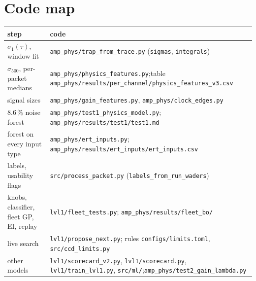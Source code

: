 \documentclass[10pt,a4paper]{article}
\newcommand{\code}[1]{\texttt{\small #1}}
\begin{document}
\section{Code map}
\begin{center}\small
\begin{tabularx}{\linewidth}{@{}lX@{}}\toprule
step & code\\\midrule
$\sigma_1(\tau)$, window fit & \code{amp\_phys/trap\_from\_trace.py} (\code{sigmas}, \code{integrals})\\
$\sigma_{500}$, per-packet medians & \code{amp\_phys/physics\_features.py};\newline table \code{amp\_phys/results/per\_channel/physics\_features\_v3.csv}\\
signal sizes & \code{amp\_phys/gain\_features.py}, \code{amp\_phys/clock\_edges.py}\\
8.6\,\% noise forest & \code{amp\_phys/test1\_physics\_model.py}; \code{amp\_phys/results/test1/test1.md}\\
forest on every input type & \code{amp\_phys/ert\_inputs.py}; \code{amp\_phys/results/ert\_inputs/ert\_inputs.csv}\\
labels, usability flags & \code{src/process\_packet.py} (\code{labels\_from\_run\_waders})\\
knobs, classifier, fleet GP, EI, replay & \code{lvl1/fleet\_tests.py}; \code{amp\_phys/results/fleet\_bo/}\\
live search & \code{lvl1/propose\_next.py}; rules \code{configs/limits.toml}, \code{src/ccd\_limits.py}\\
other models & \code{lvl1/scorecard\_v2.py}, \code{lvl1/scorecard.py}, \code{lvl1/train\_lvl1.py}, \code{src/ml/};\newline \code{amp\_phys/test2\_gain\_lambda.py}\\\bottomrule
\end{tabularx}
\end{center}
\end{document}
